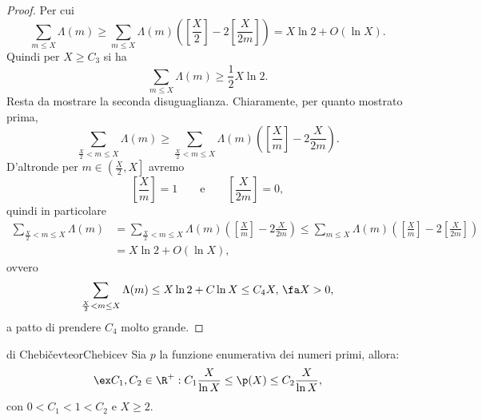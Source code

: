\begin{proof}
	Per cui
	\[
		\sum_{m\le X} \Lambda(m) \ge \sum_{m\le X} \Lambda(m) \left( \left[ \frac{X}{2} \right] -2 \left[ \frac{X}{2m} \right]  \right) = X \ln 2 +O(\ln X).
	\]
	Quindi per \(X\ge C_3\) si ha
	\[
		\sum_{m\le X} \Lambda(m) \ge \frac{1}{2}X \ln 2.
	\]
	Resta da mostrare la seconda disuguaglianza.
	Chiaramente, per quanto mostrato prima,
	\[
		\sum_{\frac{X}{2}<m \le X} \Lambda(m) \ge \sum_{\frac{X}{2}<m\le X} \Lambda(m) \left( \left[ \frac{X}{m} \right] -2 \frac{X}{2m} \right).
	\]
	D'altronde per \(m\in \left(\frac{X}{2},X\right]\) avremo
	\[
		\left[ \frac{X}{m} \right] =1 \qquad\text{e}\qquad \left[ \frac{X}{2m} \right] =0,
	\]
	quindi in particolare
	\[
		\begin{split}
			\sum_{\frac{X}{2}<m \le X} \Lambda(m) & = \sum_{\frac{X}{2}<m\le X} \Lambda(m) \left( \left[ \frac{X}{m} \right] -2 \frac{X}{2m} \right) \le \sum_{m\le X} \Lambda(m) \left( \left[ \frac{X}{m}\right]-2 \left[ \frac{X}{2m} \right]  \right)\\
			& = X\ln 2 + O(\ln X),
		\end{split}
	\]
	ovvero
	\[
		\sum_{\frac{X}{2}<m\le X} \Lambda(m) \le X \ln 2 + C \ln X \le C_4 X,\,\fa X>0,
	\]
	a patto di prendere \(C_4\) molto grande.
\end{proof}

\begin{teor}{di Chebi\v{c}ev}{teorChebicev}
	Sia \(p\) la funzione enumerativa dei numeri primi, allora:
	\[
		\ex C_1,C_2\in\R^+:C_1\frac{X}{\ln X}\le\p(X)\le C_2\frac{X}{\ln X},
	\]
	con \(0<C_1<1< C_2\) e \(X\ge 2\).
\end{teor}

